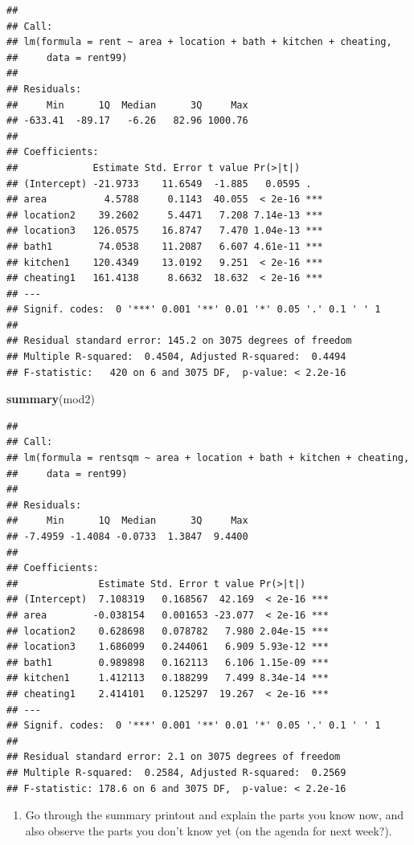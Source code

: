 \documentclass[
]{article}
\newenvironment{Shaded}{\begin{snugshade}}{\end{snugshade}}
\newcommand{\FunctionTok}[1]{\textcolor[rgb]{0.13,0.29,0.53}{\textbf{#1}}}
\newcommand{\NormalTok}[1]{#1}
\providecommand{\tightlist}{%
  \setlength{\itemsep}{0pt}\setlength{\parskip}{0pt}}
\begin{document}
\begin{verbatim}
## 
## Call:
## lm(formula = rent ~ area + location + bath + kitchen + cheating, 
##     data = rent99)
## 
## Residuals:
##     Min      1Q  Median      3Q     Max 
## -633.41  -89.17   -6.26   82.96 1000.76 
## 
## Coefficients:
##             Estimate Std. Error t value Pr(>|t|)    
## (Intercept) -21.9733    11.6549  -1.885   0.0595 .  
## area          4.5788     0.1143  40.055  < 2e-16 ***
## location2    39.2602     5.4471   7.208 7.14e-13 ***
## location3   126.0575    16.8747   7.470 1.04e-13 ***
## bath1        74.0538    11.2087   6.607 4.61e-11 ***
## kitchen1    120.4349    13.0192   9.251  < 2e-16 ***
## cheating1   161.4138     8.6632  18.632  < 2e-16 ***
## ---
## Signif. codes:  0 '***' 0.001 '**' 0.01 '*' 0.05 '.' 0.1 ' ' 1
## 
## Residual standard error: 145.2 on 3075 degrees of freedom
## Multiple R-squared:  0.4504, Adjusted R-squared:  0.4494 
## F-statistic:   420 on 6 and 3075 DF,  p-value: < 2.2e-16
\end{verbatim}

\begin{Shaded}
\begin{Highlighting}[]
\FunctionTok{summary}\NormalTok{(mod2)}
\end{Highlighting}
\end{Shaded}

\begin{verbatim}
## 
## Call:
## lm(formula = rentsqm ~ area + location + bath + kitchen + cheating, 
##     data = rent99)
## 
## Residuals:
##     Min      1Q  Median      3Q     Max 
## -7.4959 -1.4084 -0.0733  1.3847  9.4400 
## 
## Coefficients:
##              Estimate Std. Error t value Pr(>|t|)    
## (Intercept)  7.108319   0.168567  42.169  < 2e-16 ***
## area        -0.038154   0.001653 -23.077  < 2e-16 ***
## location2    0.628698   0.078782   7.980 2.04e-15 ***
## location3    1.686099   0.244061   6.909 5.93e-12 ***
## bath1        0.989898   0.162113   6.106 1.15e-09 ***
## kitchen1     1.412113   0.188299   7.499 8.34e-14 ***
## cheating1    2.414101   0.125297  19.267  < 2e-16 ***
## ---
## Signif. codes:  0 '***' 0.001 '**' 0.01 '*' 0.05 '.' 0.1 ' ' 1
## 
## Residual standard error: 2.1 on 3075 degrees of freedom
## Multiple R-squared:  0.2584, Adjusted R-squared:  0.2569 
## F-statistic: 178.6 on 6 and 3075 DF,  p-value: < 2.2e-16
\end{verbatim}

\begin{enumerate}
\def\labelenumi{\arabic{enumi}.}
\setcounter{enumi}{2}
\tightlist
\item
  Go through the summary printout and explain the parts you know now,
  and also observe the parts you don't know yet (on the agenda for next
  week?).
\end{enumerate}
\end{document}
